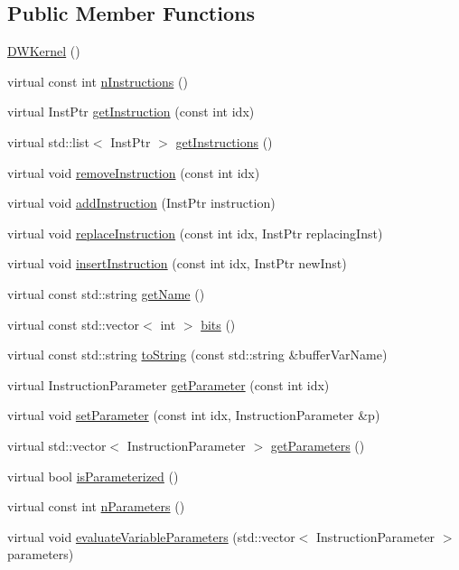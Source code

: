 \subsection*{Public Member Functions}
\begin{DoxyCompactItemize}
\item 
\hyperlink{a00983_aadd3221d4787dd639e7e26006a7ca183}{D\+W\+Kernel} ()
\item 
virtual const int \hyperlink{a00983_a79aecc7419a20b8779372ef36fc24806}{n\+Instructions} ()
\item 
virtual Inst\+Ptr \hyperlink{a00983_a00f23cd2e15ea6b9d00d4f3dbe1540f8}{get\+Instruction} (const int idx)
\item 
virtual std\+::list$<$ Inst\+Ptr $>$ \hyperlink{a00983_abbb8f2b1c78623c377524e45d581d018}{get\+Instructions} ()
\item 
virtual void \hyperlink{a00983_af2bcfd679e6cb89194f3f0bff8622b99}{remove\+Instruction} (const int idx)
\item 
virtual void \hyperlink{a00983_a4c3043d6971999c3a09e797fc55deb6c}{add\+Instruction} (Inst\+Ptr instruction)
\item 
virtual void \hyperlink{a00983_a75eb3560d2f81c9a5ae1cf765deb0e83}{replace\+Instruction} (const int idx, Inst\+Ptr replacing\+Inst)
\item 
virtual void \hyperlink{a00983_a1627af0141f70fc4a3cd500a13fb31b8}{insert\+Instruction} (const int idx, Inst\+Ptr new\+Inst)
\item 
virtual const std\+::string \hyperlink{a00983_a7f0c4d3c73029566561cf56a474bcbbd}{get\+Name} ()
\item 
virtual const std\+::vector$<$ int $>$ \hyperlink{a00983_adae68964db6acd8b4c2267c270a8ec58}{bits} ()
\item 
virtual const std\+::string \hyperlink{a00983_adbc3fdd080ebba20bc620b8832979f16}{to\+String} (const std\+::string \&buffer\+Var\+Name)
\item 
virtual Instruction\+Parameter \hyperlink{a00983_a81711b7db284aba35d6952e4d1d15d41}{get\+Parameter} (const int idx)
\item 
virtual void \hyperlink{a00983_adf89cdd1f54e183c4cff36b338b2be8d}{set\+Parameter} (const int idx, Instruction\+Parameter \&p)
\item 
virtual std\+::vector$<$ Instruction\+Parameter $>$ \hyperlink{a00983_a829462cff34e2257da06afd8a2051a8e}{get\+Parameters} ()
\item 
virtual bool \hyperlink{a00983_a8957ea368244ed4a4ebd85f6bfecb785}{is\+Parameterized} ()
\item 
virtual const int \hyperlink{a00983_a029429948329b94c1d89f32cf5c486d4}{n\+Parameters} ()
\item 
virtual void \hyperlink{a00983_a09ffac417d4ecbbd82d7a680ad8dfcce}{evaluate\+Variable\+Parameters} (std\+::vector$<$ Instruction\+Parameter $>$ parameters)
\end{DoxyCompactItemize}
